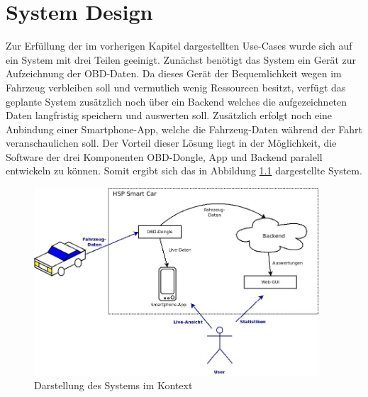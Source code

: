 \chapter{System Design}
\label{sec:systemDesign}
Zur Erfüllung der im vorherigen Kapitel dargestellten Use-Cases wurde sich auf ein System mit drei Teilen geeinigt. Zunächst benötigt das System ein Gerät zur Aufzeichnung der OBD-Daten. Da dieses Gerät der Bequemlichkeit wegen im Fahrzeug verbleiben soll und vermutlich wenig Ressourcen besitzt, verfügt das geplante System zusätzlich noch über ein Backend welches die aufgezeichneten Daten langfristig speichern und auswerten soll. Zusätzlich erfolgt noch eine Anbindung einer Smartphone-App, welche die Fahrzeug-Daten während der Fahrt veranschaulichen soll. Der Vorteil dieser Lösung liegt in der Möglichkeit, die Software der drei Komponenten OBD-Dongle, App und Backend paralell entwickeln zu können. Somit ergibt sich das in Abbildung \ref{fig:SysArch} dargestellte System.
\begin{figure}[h]
  \begin{center}
    \includegraphics[height=7cm,keepaspectratio]{./img/SysArch}
    \caption{Darstellung des Systems im Kontext}
    \label{fig:SysArch}
  \end{center}
\end{figure}



